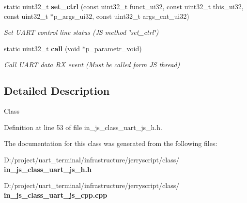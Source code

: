 \begin{DoxyCompactItemize}
static uint32\+\_\+t \textbf{ set\+\_\+ctrl} (const uint32\+\_\+t funct\+\_\+ui32, const uint32\+\_\+t this\+\_\+ui32, const uint32\+\_\+t $\ast$p\+\_\+args\+\_\+ui32, const uint32\+\_\+t args\+\_\+cnt\+\_\+ui32)
\begin{DoxyCompactList}\small\item\em Set U\+A\+RT control line status (JS method \char`\"{}set\+\_\+ctrl\char`\"{}) \end{DoxyCompactList}\item 
static uint32\+\_\+t \textbf{ call} (void $\ast$p\+\_\+parametr\+\_\+void)
\begin{DoxyCompactList}\small\item\em Call U\+A\+RT data RX event (Must be called form JS thread) \end{DoxyCompactList}\end{DoxyCompactItemize}


\subsection{Detailed Description}
Class 

Definition at line 53 of file in\+\_\+js\+\_\+class\+\_\+uart\+\_\+js\+\_\+h.\+h.



The documentation for this class was generated from the following files\+:\begin{DoxyCompactItemize}
\item 
D\+:/project/uart\+\_\+terminal/infrastructure/jerryscript/class/\textbf{ in\+\_\+js\+\_\+class\+\_\+uart\+\_\+js\+\_\+h.\+h}\item 
D\+:/project/uart\+\_\+terminal/infrastructure/jerryscript/class/\textbf{ in\+\_\+js\+\_\+class\+\_\+uart\+\_\+js\+\_\+cpp.\+cpp}\end{DoxyCompactItemize}
